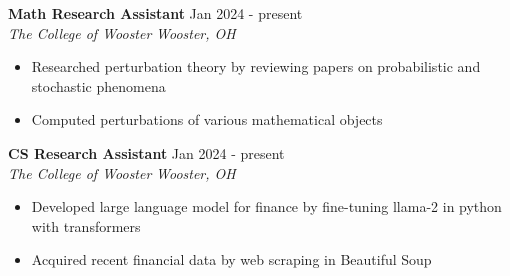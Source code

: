 \documentclass[a4paper,12pt]{article}
\begin{document}
\textbf{Math Research Assistant} \hfill \textnormal{Jan 2024 - present}\\
\textit{The College of Wooster} \hfill \textit{Wooster, OH}
\begin{itemize}
    \item Researched perturbation theory by reviewing papers on probabilistic and stochastic phenomena
    \item Computed perturbations of various mathematical objects
\end{itemize}

\textbf{CS Research Assistant} \hfill \textnormal{Jan 2024 - present}\\
\textit{The College of Wooster} \hfill \textit{Wooster, OH}
\begin{itemize}
    \item Developed large language model for finance by fine-tuning llama-2 in python with transformers
    \item Acquired recent financial data by web scraping in Beautiful Soup
\end{itemize}
\end{document}
